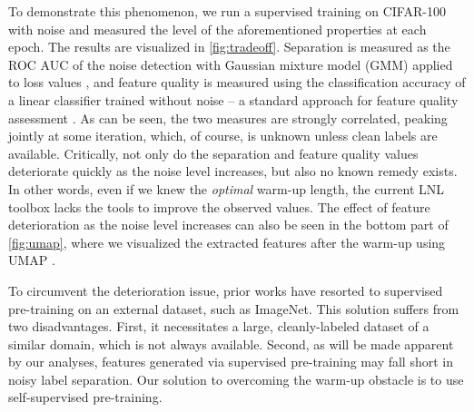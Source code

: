 \documentclass[10pt,twocolumn,letterpaper]{article}
\renewcommand{\cite}[1]{\citep{#1}}
\begin{document}
To demonstrate this phenomenon, we run a supervised training on CIFAR-100 with noise and measured the level of the aforementioned properties at each epoch. The results are visualized in \cref{fig:tradeoff}. Separation is measured as the ROC AUC of the noise detection with Gaussian mixture model (GMM) applied to loss values \cite{li2020dividemix}, and feature quality is measured using the classification accuracy of a linear classifier trained without noise -- a standard approach for feature quality assessment \cite{zhang2016colorful,henaff2019cpc2,chen2020simclr}. 
As can be seen, the two measures are strongly correlated, peaking jointly at some iteration, which, of course, is unknown unless clean labels are available. 
Critically, not only do the separation and feature quality values deteriorate quickly as the noise level increases, but also no known remedy exists. In other words, even if we knew the \textit{optimal} warm-up length, the current LNL toolbox lacks the tools to improve the observed values. The effect of feature deterioration as the noise level increases can also be seen in the bottom part of \cref{fig:umap}, where we visualized the extracted features after the warm-up using UMAP \cite{lel2018umap}. 

To circumvent the deterioration issue, prior works have resorted to supervised pre-training on an external dataset, such as ImageNet. This solution suffers from two disadvantages. First, it necessitates a large, cleanly-labeled dataset of a similar domain, which is not always available. Second, as will be made apparent by our analyses, features generated via supervised pre-training may fall short in noisy label separation.  
Our solution to overcoming the warm-up obstacle is to use self-supervised pre-training.
\end{document}
